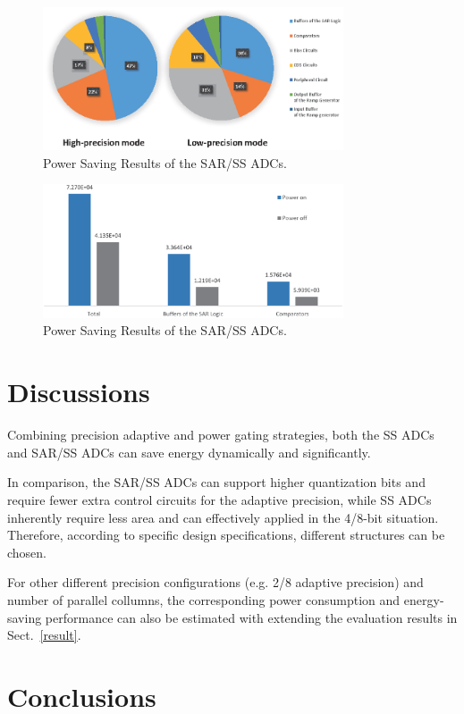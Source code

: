 \documentclass[conference]{IEEEtran}
\begin{document}
\begin{figure}[htbp]
	\centerline{\includegraphics[width=3.5in]{./Figures/SARResults1.eps}}
	\caption{Power Saving Results of the SAR/SS ADCs.}
	\label{SARresults1}
\end{figure} 
\begin{figure}[htbp]
	\centerline{\includegraphics[width=3.5in]{./Figures/SARResults2.eps}}
	\caption{Power Saving Results of the SAR/SS ADCs.}
	\label{SARresults2}
\end{figure} 

\section{Discussions}\label{discussion}
Combining precision adaptive and power gating strategies, both the SS ADCs and SAR/SS ADCs can save energy dynamically and significantly. 

In comparison, the SAR/SS ADCs can support higher quantization bits and require fewer extra control circuits for the adaptive precision, 
while SS ADCs inherently require less area and can effectively applied in the 4/8-bit situation. 
Therefore, according to specific design specifications, different structures can be chosen. 

For other different precision configurations (e.g. 2/8 adaptive precision) and number of parallel collumns, 
the corresponding power consumption and energy-saving performance can also be estimated with extending the evaluation results in Sect.~\ref{result}. 

\section{Conclusions}\label{conclusion}
\end{document}
